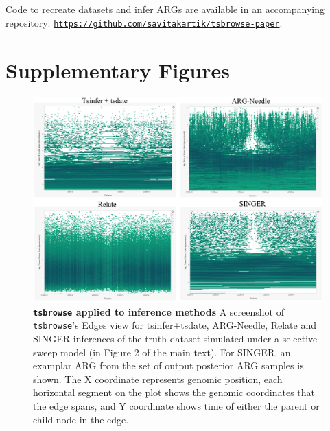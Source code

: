 \documentclass[unnumsec,webpdf,contemporary,large,namedate]{oup-authoring-template}%
\begin{document}

\subsection{} Code to recreate datasets and infer ARGs are available in an
accompanying repository:
\texttt{\url{https://github.com/savitakartik/tsbrowse-paper}}.

\clearpage
\section{Supplementary Figures}
\begin{figure}[H]
    \centering
    \includegraphics[width=0.95\linewidth]{figures/SuppFig1.png}
    \caption{\textbf{\texttt{tsbrowse} applied to inference methods}
    A screenshot of \texttt{tsbrowse}'s Edges view for tsinfer+tsdate,
ARG-Needle, Relate and SINGER inferences of the truth dataset
simulated under a selective sweep model (in Figure 2 of the main text). For
SINGER, an examplar ARG from the set of output posterior ARG samples is shown.
The X coordinate represents genomic position, each horizontal segment on the
plot shows the genomic coordinates that the edge spans, and Y coordinate shows
time of either the parent or child node in the edge.}
    \label{fig:Supplementary_Figure_1}
\end{figure}
\end{document}
